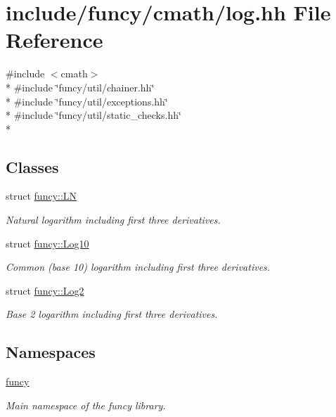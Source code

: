 \hypertarget{log_8hh}{\section{include/funcy/cmath/log.hh File Reference}
\label{log_8hh}
}
{\ttfamily \#include $<$cmath$>$}\\*
{\ttfamily \#include \char`\"{}funcy/util/chainer.\-hh\char`\"{}}\\*
{\ttfamily \#include \char`\"{}funcy/util/exceptions.\-hh\char`\"{}}\\*
{\ttfamily \#include \char`\"{}funcy/util/static\-\_\-checks.\-hh\char`\"{}}\\*
\subsection*{Classes}
\begin{DoxyCompactItemize}
\item 
struct \hyperlink{structfuncy_1_1LN}{funcy\-::\-L\-N}
\begin{DoxyCompactList}\small\item\em Natural logarithm including first three derivatives. \end{DoxyCompactList}\item 
struct \hyperlink{structfuncy_1_1Log10}{funcy\-::\-Log10}
\begin{DoxyCompactList}\small\item\em Common (base 10) logarithm including first three derivatives. \end{DoxyCompactList}\item 
struct \hyperlink{structfuncy_1_1Log2}{funcy\-::\-Log2}
\begin{DoxyCompactList}\small\item\em Base 2 logarithm including first three derivatives. \end{DoxyCompactList}\end{DoxyCompactItemize}
\subsection*{Namespaces}
\begin{DoxyCompactItemize}
\item 
\hyperlink{namespacefuncy}{funcy}
\begin{DoxyCompactList}\small\item\em Main namespace of the funcy library. \end{DoxyCompactList}\end{DoxyCompactItemize}
